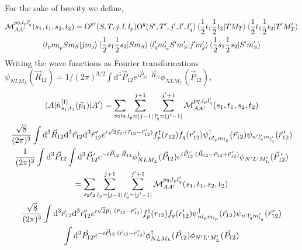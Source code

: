 \documentclass[10pt]{article}
\begin{document}
For the sake of brevity we define,
\begin{multline*}
 \mathcal{M}_{AA'}^{p q,l_p l_q'}(s_1,t_1,s_2,t_2) = \text{O}^{p\dagger}(S,T,j,l,l_p) \text{O}^{q}(S',T',j',l',l_q') \braket{ \frac{1}{2} t_1 \frac{1}{2} t_2 | T M_T } \braket{ \frac{1}{2} t_1 \frac{1}{2} t_2 | T' M_T'} \\
	\braket{ l_p  m_{l_p} S m_S | j m_j } \braket{   \frac{1}{2} s_1 \frac{1}{2} s_2 | S m_S} 
	\braket{ l_q' m_{l_q}' S' m_S' | j' m_j' } \braket{   \frac{1}{2} s_1 \frac{1}{2} s_2 | S' m_S'} \\
\end{multline*}
Writing the wave functions as Fourier transformations $ \psi_{N L M_L}(\vec{R}_{12}) = 1/(2 \pi)^{3/2} \int \text{d}^{3} \vec{P}_{12} e^{ i \vec{P}_{12} \cdot \vec{R}_{12}} \phi_{N L M_L}(\vec{P}_{12})$,
\begin{multline*}
	\braket{ A | \hat{n}_{s_1,t_1}^{[1]}(\vec{p}_1) | A'} = \sum_{s_2 t_2}  \sum_{l_p = |j-1|}^{j+1} \sum_{l_q' = |j' - 1|}^{j'+1} \mathcal{M}_{AA'}^{p q,l_p l_q'}(s_1,t_1,s_2,t_2) \\
   \frac{\sqrt{8}}{(2 \pi)^{3}} \int \text{d}^{3} \vec{R}_{12} \text{d}^{3} \vec{r}_{12} \text{d}^{3} \vec{r}_{12}^{\, \prime}  e^{ i \sqrt{2} \vec{p}_{1} \cdot ( \vec{r}_{12} - \vec{r}_{12}^{\, \prime}) }  f_{p}^{\dagger}(r_{12}) f_{q}(r_{12}') \psi_{ n l_p m_{l_p} }^{\dagger}(\vec{r}_{12}) \psi_{ n' l_q' m_{l_q'} }(\vec{r}_{12}^{\, \prime})  \\
   \frac{1}{(2 \pi)^{3}} \int \text{d}^{3} \vec{P}_{12} \int \text{d}^{3} \vec{P}_{12}^{\, \prime} e^{ -i \vec{P}_{12} \cdot \vec{R}_{12}} \phi_{N L M_L}^{\dagger}(\vec{P}_{12}) e^{ i \vec{P}_{12}^{\, \prime} \cdot ( \vec{R}_{12} - \vec{r}_{12} + \vec{r}_{12}^{\, \prime})} \phi_{N' L' M_L'}(\vec{P}_{12}^{\, \prime}) \\
   = \sum_{s_2 t_2}  \sum_{l_p = |j-1|}^{j+1} \sum_{l_q' = |j' - 1|}^{j'+1} \mathcal{M}_{AA'}^{p q,l_p l_q'}(s_1,t_1,s_2,t_2) \\
    \frac{\sqrt{8}}{(2 \pi)^{3}} \int \text{d}^{3} \vec{r}_{12} \text{d}^{3} \vec{r}_{12}^{\, \prime}  e^{ i \sqrt{2} \vec{p}_{1} \cdot ( \vec{r}_{12} - \vec{r}_{12}^{\, \prime}) } f_{p}^{\dagger}(r_{12}) f_{q}(r_{12}')  \psi_{ n l_p m_{l_p}}^{\dagger}(\vec{r}_{12}) \psi_{ n' l_q' m_{l_q}' }(\vec{r}_{12}^{\, \prime}) \\
   \int \text{d}^{3} \vec{P}_{12} e^{ -i \vec{P}_{12} \cdot (\vec{r}_{12} - \vec{r}_{12}^{\, \prime})} \phi_{N L M_L}^{\dagger}(\vec{P}_{12}) \phi_{N' L' M_L'}(\vec{P}_{12}) 
\end{multline*}
\end{document}
